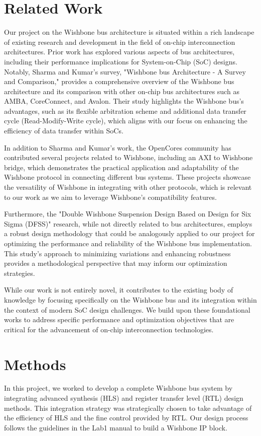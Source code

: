 \documentclass[conference]{IEEEtran}
\begin{document}
\section{Related Work}
Our project on the Wishbone bus architecture is situated within a rich landscape of existing research and development in the field of on-chip interconnection architectures. Prior work has explored various aspects of bus architectures, including their performance implications for System-on-Chip (SoC) designs. Notably, Sharma and Kumar's survey, "Wishbone bus Architecture - A Survey and Comparison," provides a comprehensive overview of the Wishbone bus architecture and its comparison with other on-chip bus architectures such as AMBA, CoreConnect, and Avalon. Their study highlights the Wishbone bus's advantages, such as its flexible arbitration scheme and additional data transfer cycle (Read-Modify-Write cycle)\cite{Sharma_2012}, which aligns with our focus on enhancing the efficiency of data transfer within SoCs.

In addition to Sharma and Kumar's work, the OpenCores community has contributed several projects related to Wishbone, including an AXI to Wishbone bridge, which demonstrates the practical application and adaptability of the Wishbone protocol in connecting different bus systems\cite{opencores_wishbone}. These projects showcase the versatility of Wishbone in integrating with other protocols, which is relevant to our work as we aim to leverage Wishbone's compatibility features.

Furthermore, the "Double Wishbone Suspension Design Based on Design for Six Sigma (DFSS)" research, while not directly related to bus architectures, employs a robust design methodology that could be analogously applied to our project for optimizing the performance and reliability of the Wishbone bus implementation\cite{10.1145/3421766.3421866}. This study's approach to minimizing variations and enhancing robustness provides a methodological perspective that may inform our optimization strategies.


While our work is not entirely novel, it contributes to the existing body of knowledge by focusing specifically on the Wishbone bus and its integration within the context of modern SoC design challenges. We build upon these foundational works to address specific performance and optimization objectives that are critical for the advancement of on-chip interconnection technologies.



\section{Methods}
In this project, we worked to develop a complete Wishbone bus system by integrating advanced synthesis (HLS) and register transfer level (RTL) design methods. This integration strategy was strategically chosen to take advantage of the efficiency of HLS and the fine control provided by RTL. Our design process follows the guidelines in the Lab1 manual\cite{ECE4810J_FA2024_Lab1} to build a Wishbone IP block.
\end{document}
